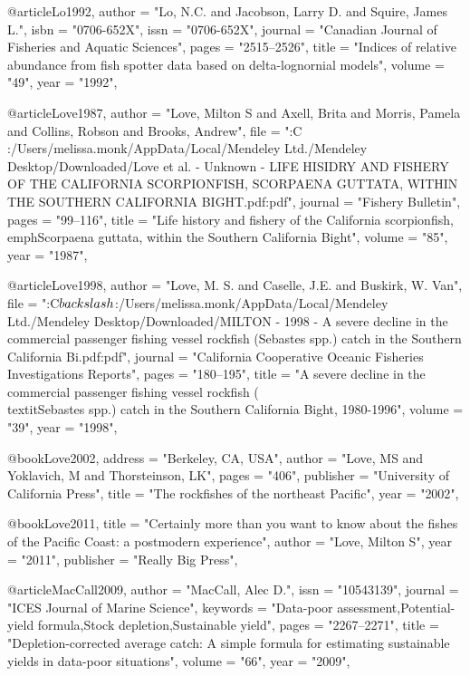 @article{Lo1992,
    author = "{Lo, N.C. and Jacobson, Larry D. and Squire, James L.}",
    isbn = "{0706-652X}",
    issn = "{0706-652X}",
    journal = "{Canadian Journal of Fisheries and Aquatic Sciences}",
    pages = "{2515--2526}",
    title = "{{Indices of relative abundance from fish spotter data based on delta-lognornial models}}",
    volume = "{49}",
    year = "{1992}",
}


@article{Love1987,
    author = "{Love, Milton S and Axell, Brita and Morris, Pamela and Collins, Robson and Brooks, Andrew}",
    file = "{:C\\:/Users/melissa.monk/AppData/Local/Mendeley Ltd./Mendeley Desktop/Downloaded/Love et al. - Unknown - LIFE HISIDRY AND FISHERY OF THE CALIFORNIA SCORPIONFISH, SCORPAENA GUTTATA, WITHIN THE SOUTHERN CALIFORNIA BIGHT.pdf:pdf}",
    journal = "{Fishery Bulletin}",
    pages = "{99--116}",
    title = "{{Life history and fishery of the California scorpionfish, \\emph{Scorpaena guttata}, within the Southern California Bight}}",
    volume = "{85}",
    year = "{1987}",
}

@article{Love1998,
    author = "{Love, M. S. and Caselle, J.E. and Buskirk, W. Van}",
    file = "{:C$\\backslash$:/Users/melissa.monk/AppData/Local/Mendeley Ltd./Mendeley Desktop/Downloaded/MILTON - 1998 - A severe decline in the commercial passenger fishing vessel rockfish (Sebastes spp.) catch in the Southern California Bi.pdf:pdf}",
    journal = "{California Cooperative Oceanic Fisheries Investigations Reports}",
    pages = "{180--195}",
    title = "{{A severe decline in the commercial passenger fishing vessel rockfish (\\textit{{Sebastes}} spp.) catch in the Southern California Bight, 1980-1996}}",
    volume = "{39}",
    year = "{1998}",
}

@book{Love2002,
    address = "{Berkeley, CA, USA}",
    author = "{Love, MS and Yoklavich, M and Thorsteinson, LK}",
    pages = "{406}",
    publisher = "{University of California Press}",
    title = "{{The rockfishes of the northeast Pacific}}",
    year = "{2002}",
}

@book{Love2011,
    title = "{Certainly more than you want to know about the fishes of the Pacific Coast: a postmodern experience}",
    author = "{Love, Milton S}",
    year = "{2011}",
    publisher = "{Really Big Press}",
}

@article{MacCall2009,
    author = "{MacCall, Alec D.}",
    issn = "{10543139}",
    journal = "{ICES Journal of Marine Science}",
    keywords = "{Data-poor assessment,Potential-yield formula,Stock depletion,Sustainable yield}",
    pages = "{2267--2271}",
    title = "{{Depletion-corrected average catch: A simple formula for estimating sustainable yields in data-poor situations}}",
    volume = "{66}",
    year = "{2009}",
}

